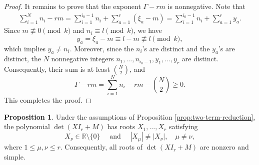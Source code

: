 \documentclass[preprint,3p,10pt]{elsarticle}
\newcommand{\R}{\mathbb R}
\theoremstyle{definition}
\newtheorem{proposition}[definition]{Proposition}
\begin{document}
\begin{proof}
It remains to prove that the exponent \(\Gamma-rm\) is nonnegative. Note that
\begin{align}
    \sum_{i=1}^{N}n_i-rm
    =
    \sum_{i=1}^{i_0-1}n_i+\sum_{a=1}^{r}(\xi_a-m) =
    \sum_{i=1}^{i_0-1}n_i+\sum_{a=1}^{r}y_a.
\end{align}
Since \(m\not\equiv0\pmod{k}\) and \(n_i\equiv l\pmod{k}\), we have
\begin{equation}
    y_a=\xi_a-m\equiv l-m\not\equiv l\pmod{k},
\end{equation}
which implies \(y_a\neq n_i\).
Moreover, since the \(n_i\)'s are distinct and the \(y_a\)'s are distinct,
the \(N\) nonnegative integers
\(n_1,\ldots,n_{i_0-1},y_1,\ldots,y_r\) are distinct. Consequently,
their sum is at least \(\binom{N}{2}\), and 
\begin{equation}
    \Gamma-rm
    =
    \sum_{i=1}^{N}n_i-rm-\binom{N}{2}
    \ge0.
\end{equation}
This completes the proof.
\end{proof}


\begin{proposition}\label{prop:reduced-roots}
Under the assumptions of Proposition \ref{prop:two-term-reduction}, the polynomial
\(\det(XI_r+M)\) has roots \(X_1,\ldots,X_r\) satisfying
\begin{equation}
    X_\nu\in\R\setminus\{0\}\quad
    \text{ and } \quad
    |X_\mu|\ne |X_\nu|,
    \quad \mu\ne\nu,
\end{equation}
where $1\le\mu,\nu\le r.$
Consequently, all roots of \(\det(X I_r+M)\) are nonzero and simple.
\end{proposition}
\end{document}

